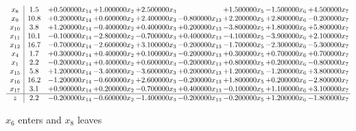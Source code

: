 \documentclass[10pt]{article}
\begin{document}
 \[\begin{array}{c| c c@{\hskip 2pt} c@{\hskip 2pt} c@{\hskip 2pt} c@{\hskip 2pt} c@{\hskip 2pt} c@{\hskip 2pt} c@{\hskip 2pt} }
 x_{8}   &  1.5 & + 0.500000 x_{14} & + 1.000000 x_{2} & + 2.500000 x_{3} &   & + 1.500000 x_{5} & -1.500000 x_{6} & + 4.500000 x_{7}\\
 x_{9}   &  10.8 & + 0.200000 x_{14} & + 0.600000 x_{2} & + 2.400000 x_{3} & -0.800000 x_{13} & + 2.200000 x_{5} & + 2.800000 x_{6} & -0.200000 x_{7}\\
 x_{10}   &  3.8 & + 1.200000 x_{14} & -0.400000 x_{2} & + 0.400000 x_{3} & + 0.200000 x_{13} & -3.800000 x_{5} & + 1.800000 x_{6} & + 5.800000 x_{7}\\
 x_{11}   &  10.1 & -0.100000 x_{14} & -2.800000 x_{2} & -0.700000 x_{3} & + 0.400000 x_{13} & -4.100000 x_{5} & -3.900000 x_{6} & + 2.100000 x_{7}\\
 x_{12}   &  16.7 & -0.700000 x_{14} & -2.600000 x_{2} & + 3.100000 x_{3} & -0.200000 x_{13} & -1.700000 x_{5} & -2.300000 x_{6} & -5.300000 x_{7}\\
 x_{4}   &  1.7 & + 0.300000 x_{14} & + 0.400000 x_{2} & + 0.100000 x_{3} & -0.200000 x_{13} & + 0.300000 x_{5} & + 0.700000 x_{6} & + 0.700000 x_{7}\\
 x_{1}   &  2.2 & -0.200000 x_{14} & + 0.400000 x_{2} & + 0.600000 x_{3} & -0.200000 x_{13} & + 0.800000 x_{5} & + 0.200000 x_{6} & -0.800000 x_{7}\\
 x_{15}   &  5.8 & + 1.200000 x_{14} & -3.400000 x_{2} & -3.600000 x_{3} & + 0.200000 x_{13} & + 1.200000 x_{5} & -1.200000 x_{6} & + 3.800000 x_{7}\\
 x_{16}   &  16.2 & -1.200000 x_{14} & -0.600000 x_{2} & + 2.600000 x_{3} & -0.200000 x_{13} & + 1.800000 x_{5} & + 0.200000 x_{6} & -2.800000 x_{7}\\
 x_{17}   &  3.1 & + 0.900000 x_{14} & + 0.200000 x_{2} & -0.700000 x_{3} & + 0.400000 x_{13} & -0.100000 x_{5} & + 1.100000 x_{6} & + 3.100000 x_{7}\\
\hline
z    &  2.2 & -0.200000 x_{14} & -0.600000 x_{2} & -1.400000 x_{3} & -0.200000 x_{13} & -0.200000 x_{5} & + 1.200000 x_{6} & -1.800000 x_{7}\\
\end{array}\]


 $ x_{6} $ enters and $ x_{8} $ leaves 
\end{document}
